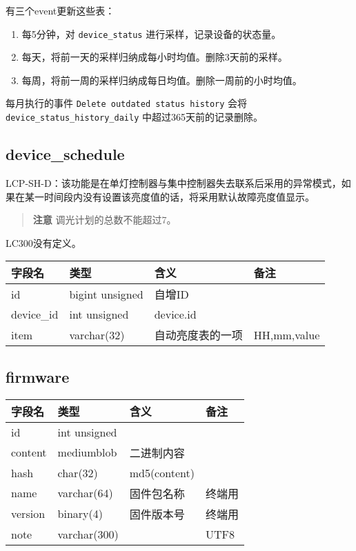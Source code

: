 有三个event更新这些表：

\begin{enumerate}
\def\labelenumi{\arabic{enumi}.}
\itemsep1pt\parskip0pt
\item
  每5分钟，对 \texttt{device\_status} 进行采样，记录设备的状态量。
\item
  每天，将前一天的采样归纳成每小时均值。删除3天前的采样。
\item
  每周，将前一周的采样归纳成每日均值。删除一周前的小时均值。
\end{enumerate}

每月执行的事件 \texttt{Delete outdated status history} 会将
\texttt{device\_status\_history\_daily} 中超过365天前的记录删除。

\subsection{device\_schedule}\label{deviceux5fschedule}

LCP-SH-D：该功能是在单灯控制器与集中控制器失去联系后采用的异常模式，如果在某一时间段内没有设置该亮度值的话，将采用默认故障亮度值显示。

\begin{quote}
\textbf{注意} 调光计划的总数不能超过7。
\end{quote}

LC300没有定义。

\begin{longtabu}[c]{@{}lXXX@{}}
\toprule
字段名 & 类型 & 含义 & 备注\tabularnewline
\midrule
\endhead
id & bigint unsigned & 自增ID &\tabularnewline
device\_id & int unsigned & device.id &\tabularnewline
item & varchar(32) & 自动亮度表的一项 & HH,mm,value\tabularnewline
\bottomrule
\end{longtabu}

\subsection{firmware}\label{firmware}

\begin{longtabu}[c]{@{}lXXX@{}}
\toprule
字段名 & 类型 & 含义 & 备注\tabularnewline
\midrule
\endhead
id & int unsigned & &\tabularnewline
content & mediumblob & 二进制内容 &\tabularnewline
hash & char(32) & md5(content) &\tabularnewline
name & varchar(64) & 固件包名称 & 终端用\tabularnewline
version & binary(4) & 固件版本号 & 终端用\tabularnewline
note & varchar(300) & & UTF8\tabularnewline
\bottomrule
\end{longtabu}

